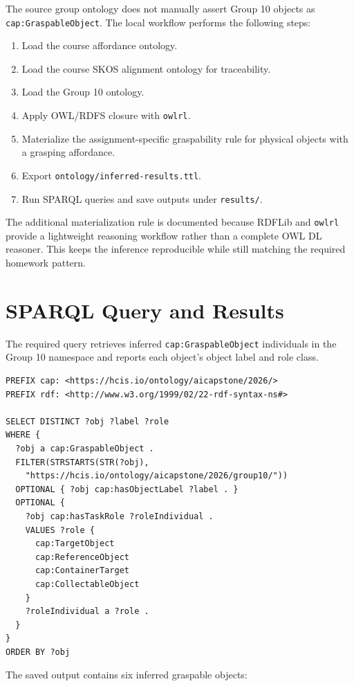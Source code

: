 \documentclass[a4paper, 11pt]{article}
\begin{document}
The source group ontology does not manually assert Group 10 objects as \texttt{cap:GraspableObject}. The local workflow performs the following steps:

\begin{enumerate}
    \item Load the course affordance ontology.
    \item Load the course SKOS alignment ontology for traceability.
    \item Load the Group 10 ontology.
    \item Apply OWL/RDFS closure with \texttt{owlrl}.
    \item Materialize the assignment-specific graspability rule for physical objects with a grasping affordance.
    \item Export \texttt{ontology/inferred-results.ttl}.
    \item Run SPARQL queries and save outputs under \texttt{results/}.
\end{enumerate}

The additional materialization rule is documented because RDFLib and \texttt{owlrl} provide a lightweight reasoning workflow rather than a complete OWL DL reasoner. This keeps the inference reproducible while still matching the required homework pattern.

\section{SPARQL Query and Results}

The required query retrieves inferred \texttt{cap:GraspableObject} individuals in the Group 10 namespace and reports each object's object label and role class.

\begin{lstlisting}[language=SPARQL]
PREFIX cap: <https://hcis.io/ontology/aicapstone/2026/>
PREFIX rdf: <http://www.w3.org/1999/02/22-rdf-syntax-ns#>

SELECT DISTINCT ?obj ?label ?role
WHERE {
  ?obj a cap:GraspableObject .
  FILTER(STRSTARTS(STR(?obj),
    "https://hcis.io/ontology/aicapstone/2026/group10/"))
  OPTIONAL { ?obj cap:hasObjectLabel ?label . }
  OPTIONAL {
    ?obj cap:hasTaskRole ?roleIndividual .
    VALUES ?role {
      cap:TargetObject
      cap:ReferenceObject
      cap:ContainerTarget
      cap:CollectableObject
    }
    ?roleIndividual a ?role .
  }
}
ORDER BY ?obj
\end{lstlisting}

The saved output contains six inferred graspable objects:
\end{document}
